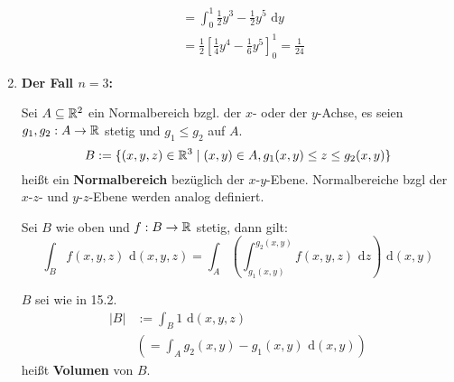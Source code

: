 \documentclass[a4paper,twoside,DIV15,BCOR12mm,chapterprefix=true,headings=twolinechapter]{scrbook}
\begin{document}
\begin{enumerate}
\begin{beispiele}
\begin{align*}
&=\int_0^1 \frac12y^3-\frac12y^5 \text{ d}y\\
&= \frac12 \left[ \frac14y^4-\frac16 y^5\right]_0^1 = \frac1{24}
\end{align*}
\end{beispiele}
\item \textbf{Der Fall $n=3$:}\\
\begin{definition}
Sei $A\subseteq\mathbb{R}^2$ ein Normalbereich bzgl. der $x$- oder der $y$-Achse,
es seien $g_1,g_2:A\to\mathbb{R}$ stetig und $g_1\le g_2$ auf $A$.
\[B:=\{(x,y,z)\in\mathbb{R}^3\mid (x,y)\in A, g_1(x,y)\le z\le g_2(x,y)\}\]
heißt ein \textbf{Normalbereich} bezüglich der $x$-$y$-Ebene.
Normalbereiche bzgl der $x$-$z$- und $y$-$z$-Ebene werden analog definiert.
\end{definition}

\begin{satz}
Sei $B$ wie oben und $f:B\to\mathbb{R}$ stetig, dann gilt:
\[\int_B f(x,y,z) \text{ d}(x,y,z) = \int_A\left(\int_{g_1(x,y)}^{g_2(x,y)} f(x,y,z) \text{ d}z\right)\text{ d}(x,y)\]
\end{satz}

\begin{definition}
$B$ sei wie in 15.2.
\begin{align*}
|B|&:=\int_B 1\text{ d}(x,y,z)\\
&\left( = \int_A g_2(x,y)-g_1(x,y)\text{ d}(x,y)\right)
\end{align*}
heißt \textbf{Volumen} von $B$.
\end{definition}



\end{enumerate}
\end{document}
